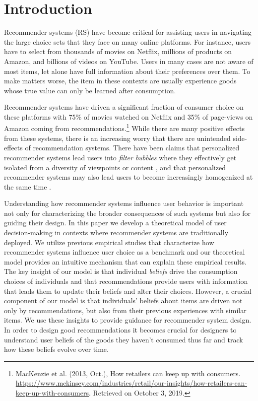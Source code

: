\documentclass[format=acmsmall, review=false]{acmart}
\title[\PaperTitle]{\PaperTitle}
\begin{document}
\maketitle


\section{Introduction}

Recommender systems (RS) have become critical for assisting users in navigating the large choice sets that they face on many online platforms. For instance, users have to select from thousands of movies on Netflix, millions of products on Amazon, and billions of videos on YouTube. Users in many cases are not aware of most items, let alone have full information about their preferences over them. To make matters worse, the item in these contexts are usually experience goods whose true value can only be learned after consumption.
\par

Recommender systems have driven a significant fraction of consumer choice on these platforms with 75\% of movies watched on Netflix and 35\% of page-views on Amazon coming from recommendations.\footnote{MacKenzie et al. (2013, Oct.),  How retailers can keep up with consumers. \url{https://www.mckinsey.com/industries/retail/our-insights/how-retailers-can-keep-up-with-consumers}. Retrieved on October 3, 2019.} While there are many positive effects from these systems, there is an increasing worry that there are unintended side-effects of recommendation systems. There have been claims that personalized recommender systems lead users into \textit{filter bubbles} where they effectively get isolated from a diversity of viewpoints or content \cite{pariser2011filter}, and that personalized recommender systems may also lead users to become increasingly homogenized at the same time \cite{chaney2018algorithmic, hosanagar2013will}.
\par
Understanding how recommender systems influence user behavior is important not only for characterizing the broader consequences of such systems but also for guiding their design. In this paper we develop a theoretical model of user decision-making in contexts where recommender systems are traditionally deployed. We utilize previous empirical studies that characterize how recommender systems influence user choice as a benchmark and our theoretical model provides an intuitive mechanism that can explain these empirical results. The key insight of our model is that individual \textit{beliefs} drive the consumption choices of individuals and that recommendations provide users with information that leads them to update their beliefs and alter their choices. However, a crucial component of our model is that individuals' beliefs about items are driven not only by recommendations, but also from their previous experiences with similar items. We use these insights to provide guidance for recommender system design. In order to design good recommendations it becomes crucial for designers to understand user beliefs of the goods they haven't consumed thus far and track how these beliefs evolve over time.
\end{document}
